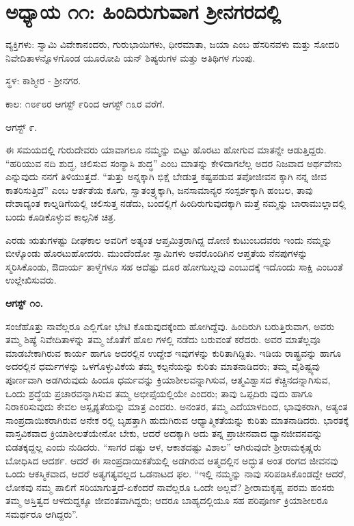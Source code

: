 
\chapter{ಅಧ್ಯಾಯ ೧೧: ಹಿಂದಿರುಗುವಾಗ ಶ‍್ರೀನಗರದಲ್ಲಿ}

ವ್ಯಕ್ತಿಗಳು: ಸ್ವಾಮಿ ವಿವೇಕಾನಂದರು, ಗುರುಭಾಯಿಗಳು, ಧೀರಮಾತಾ, ಜಯಾ ಎಂಬ ಹೆಸರಿನವಳು ಮತ್ತು ಸೋದರಿ ನಿವೇದಿತಾಳನ್ನೊಳಗೊಂಡ ಯೂರೋಪಿ ಯನ್ ಶಿಷ್ಯರುಗಳ ಮತ್ತು ಅತಿಥಿಗಳ ಗುಂಪು.

ಸ್ಥಳ: ಕಾಶ್ಮೀರ - ಶ‍್ರೀನಗರ.

ಕಾಲ: ೧೮೯೮ರ ಆಗಸ್ಟ್ ೯ರಿಂದ ಆಗಸ್ಟ್ ೧೩ರ ವರೆಗೆ.

ಆಗಸ್ಟ್ ೯.

ಈ ಸಮಯದಲ್ಲಿ ಗುರುದೇವರು ಯಾವಾಗಲೂ ನಮ್ಮನ್ನು ಬಿಟ್ಟು ಹೊರಟು ಹೋಗುವ ಮಾತನ್ನೇ ಆಡುತ್ತಿದ್ದರು. “ಹರಿಯುವ ನದಿ ಶುದ್ಧ, ಚಲಿಸುವ ಸಂನ್ಯಾಸಿ ಶುದ್ಧ” ಎಂಬ ಮಾತನ್ನು ಕೇಳಿದಾಗಲೆಲ್ಲ ಅದರ ನಿಜವಾದ ಅರ್ಥವೇನು ಎನ್ನುವುದು ನನಗೆ ತಿಳಿಯುತ್ತದೆ. “ತುತ್ತು ಅನ್ನಕ್ಕಾಗಿ ಭಿಕ್ಷೆ ಬೇಡುತ್ತ ಕಷ್ಟಪಡುವ ತಪೋಜೀವನ ಕ್ಕಾಗಿ ನನ್ನ ಜೀವ ಕಾತರಿಸುತ್ತಿದೆ” ಎಂಬ ಆರ್ತತೆಯ ಕೂಗು, ಸ್ವಾತಂತ್ರ್ಯಕ್ಕಾಗಿ, ಜನಸಾಮಾನ್ಯರ ಸಂಸ್ಪರ್ಶಕ್ಕಾಗಿ ಹಂಬಲ, ತಾವು ದೇಶಾದ್ಯಂತ ಕಾಲ್ನಡಿಗೆಯಲ್ಲಿ ಚಲಿಸುತ್ತ ನಡೆದು, ಬಂದಲ್ಲಿಗೆ ಹಿಂದಿರುಗುವುದಕ್ಕಾಗಿ ಮತ್ತೆ ನಮ್ಮನ್ನು ಬಾರಾಮುಲ್ಲಾದಲ್ಲಿ ಬಂದು ಕೂಡಿಕೊಳ್ಳುವ ಕಾಲ್ಪನಿಕ ಚಿತ್ರ.

ಎರಡು ಋತುಗಳಷ್ಟು ದೀಘಕಾಲ ಅವರಿಗೆ ಅತ್ಯಂತ ಆಪ್ತಮಿತ್ರರಾಗಿದ್ದ ದೋಣಿ ಕುಟುಂಬದವರು ಇಂದು ನಮ್ಮನ್ನು ಬೀಳ್ಕೊಂಡು ಹೊರಟುಹೋದರು. ಮುಂದೆಂದೋ ಸ್ವಾಮಿಗಳು ಅವರೊಂದಿಗಿನ ಆಪ್ತತೆಯ ನೆನಪುಗಳನ್ನು ಸ್ಮರಿಸಿಕೊಂಡು, ಔದಾರ್ಯ ತಾಳ್ಮೆಗಳೂ ಸಹ ಅದೆಷ್ಟು ದೂರ ಹೋಗಬಲ್ಲವು ಎಂಬುದಕ್ಕೆ ಇದೊಂದು ಸಾಕ್ಷಿ ಎಂಬಂತೆ ಉಲ್ಲೇಖಿಸುವರು.

\textbf{ಆಗಸ್ಟ್ ೧೦.}

ಸಂಜೆಹೊತ್ತು ನಾವೆಲ್ಲರೂ ಎಲ್ಲಿಗೋ ಭೇಟಿ ಕೊಡುವುದಕ್ಕೆಂದು ಹೋಗಿದ್ದೆವು. ಹಿಂದಿರುಗಿ ಬರುತ್ತಿರುವಾಗ, ಅವರು ತಮ್ಮ ಶಿಷ್ಯೆ ನಿವೇದಿತಾಳನ್ನು ತಮ್ಮ ಜೊತೆಗೆ ಹೊಲ ಗಳಲ್ಲಿ ನಡೆದು ಬರುವಂತೆ ಕರೆದರು. ಅವರ ಮಾತೆಲ್ಲವೂ ಮಾಡಬೇಕಾಗಿರುವ ಕಾರ್ಯ ಹಾಗೂ ಅದರಲ್ಲಿನ ಉದ್ದೇಶ ಇವುಗಳನ್ನು ಕುರಿತಾಗಿದ್ದಿತು. ಇಡಿಯ ರಾಷ್ಟ್ರವನ್ನು ಹಾಗೂ ಅದರಲ್ಲಿನ ಧರ್ಮಗಳನ್ನು ಒಳಗೊಳ್ಳುವಿಕೆಯ ತಮ್ಮ ಕಲ್ಪನೆಯನ್ನು ಕುರಿತು ಮಾತನಾಡಿದರು; ತಮ್ಮ ವೈಶಿಷ್ಟ್ಯವು ಪೂರ್ಣವಾಗಿ ಅಡಗಿರುವುದು ಹಿಂದೂ ಧರ್ಮವನ್ನು ಕ್ರಿಯಾಶೀಲವನ್ನಾಗಿಸುವ, ಆತ್ಮವಿಶ್ವಾಸದ ಕೆಚ್ಚಿನದನ್ನಾಗಿಸುವ, ಒಂದು ಶ್ರದ್ಧೆಯ ಪ್ರಚಾರವನ್ನಾಗಿಸುವ ತಮ್ಮ ಅಭೀಪ್ಸೆಯಲ್ಲಿಯೇ ಎಂದರು; ತಾವು ಒಪ್ಪದಿರು ವುದು ಹಾಗೂ ನಿರಾಕರಿಸುವುದು ಕೇವಲ ಅಸ್ಪೃಶ್ಯತೆಯನ್ನು ಮಾತ್ರ ಎಂದರು. ಅನಂತರ, ತಮ್ಮ ಎದೆಯಾಳದಿಂದ, ಭಾವುಕರಾಗಿ, ಅತ್ಯಂತ ಸಾಂಪ್ರದಾಯಿಕರಾಗಿರುವ ಅನೇಕ ರಲ್ಲಿ ಬೃಹತ್ತಾಗಿ ಹುದುಗಿರುವ ಆಧ್ಯಾತ್ಮಿಕತೆಯನ್ನು ಕುರಿತು ಮಾತನಾಡಿದರು. ಭಾರತಕ್ಕೆ ವಾಸ್ತವಿಕವಾದ ಕ್ರಿಯಾಶೀಲತೆಯೇನೋ ಬೇಕು, ಆದರೆ ಅದಕ್ಕಾಗಿ ಅದು ತನ್ನ ಪ್ರಾಚೀನವಾದ ಧ್ಯಾನಜೀವನವನ್ನು ಬಿಡತಕ್ಕದ್ದಲ್ಲ ಎಂದು ನುಡಿದರು. “ಸಾಗರ ದಷ್ಟು ಆಳ, ಆಕಾಶದಷ್ಟು ವಿಶಾಲ” ಆಗಿರುವುದೇ ಶ‍್ರೀರಾಮಕೃಷ್ಣರು ಬೋಧಿಸಿದ ಆದರ್ಶ. ಆದರೆ ಈ ಸಾಂಪ್ರದಾಯಿಕತೆಯಲ್ಲಿ ಅಡಗಿರುವ ಆತ್ಮದಲ್ಲಿನ ಅದ್ಭುತ ಅಂತ ರಂಗದ ಜೀವನವು ಒಂದು ಆಕಸ್ಮಿಕವಾದ, ಆದರೆ ಅತ್ಯಗತ್ಯವಲ್ಲದ ಒಡನಾಟದ ಫಲ. “ಇಲ್ಲಿ ನಮ್ಮನ್ನು ನಾವು ಸರಿಪಡಿಸಿಕೊಂಡದ್ದೇ ಆದರೆ, ಲೋಕವು ನಮ್ಮ ಪಾಲಿಗೆ ಸರಿಯಾಗುತ್ತದೆ-ಏಕೆಂದರೆ ನಾವೆಲ್ಲರೂ ಒಂದೇ ಅಲ್ಲವೆ? ಶ‍್ರೀರಾಮಕೃಷ್ಣ ಪರಮ ಹಂಸರು ತಮ್ಮ ಅಸ್ತಿತ್ವದ ಆಳದುದ್ದಕ್ಕೂ ಜೀವಂತವಾಗಿದ್ದರು; ಆದರೂ ಬಾಹ್ಯದಲ್ಲಿಯೂ ಸಹ ಪರಿಪೂರ್ಣ ಕ್ರಿಯಾಶೀಲರೂ ಸಮರ್ಥರೂ ಆಗಿದ್ದರು”.

